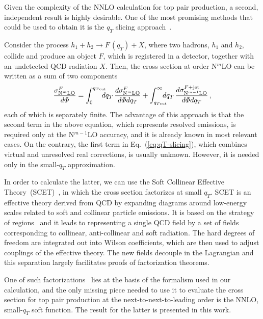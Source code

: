 \documentclass[a4paper,11pt]{article}
\numberwithin{equation}{section}
\begin{document}
Given the complexity of the NNLO calculation for top pair production, a second,
independent result is highly desirable. One of the most promising methods
that could be used to obtain it is the $q_T$ slicing
approach~\cite{Catani:2007vq}. 

Consider the process $  h_1 + h_2 \to F\, {\textstyle (q_T)} + X$,
where two hadrons, $h_1$ and $h_2$, collide and produce an object $F$, which is
registered in a detector, together with an undetected QCD radiation $X$. Then,
the cross section at order N$^m$LO can be written as
a sum of two components
%
\begin{equation}
  \frac{\sigma_{{\rm N}^m{\rm LO}}^{F}}{d\Phi} = 
  \int^{q_{T{\rm cut}}}_0 
  \!\!\!\!\! d q_T\,
  \frac{d\sigma^{F}_{{\rm N}^m{\rm LO}}}{d\Phi dq_T} +
  \int_{q_{T{\rm cut}}}^\infty 
  \!\!\!\!\! d q_T\,
  \frac{d\sigma^{F + {\rm jet}}_{{\rm N}^{m-1}{\rm LO}}}{d\Phi dq_T}\,,
  \label{eq:qT-slicing}
\end{equation}
%
each of which is separately finite.
%
The advantage of this approach is that the second term in the above equation,
which represents resolved emissions, is required only at the N$^{m-1}$LO
accuracy, and it is already known in most relevant cases.  
%
On the contrary, the first term in Eq.~(\ref{eq:qT-slicing}), which combines
virtual and unresolved real corrections, is usually unknown. However, it is
needed only in the small-$q_T$ approximation.

In order to calculate the latter, we can use the Soft Collinear Effective
Theory~(SCET)~\cite{Becher:2014oda}, in which the cross section factorizes at
small $q_T$. 
%
SCET is an effective theory derived from QCD by expanding diagrams around
low-energy scales related to soft and collinear particle emissions. It is based
on the strategy of regions~\cite{Jantzen:2011nz} and it leads to representing a
single QCD field by a set of fields corresponding to collinear, anti-collinear
and soft radiation. The hard degrees of freedom are integrated out into Wilson
coefficients, which are then used to adjust couplings of the effective
theory. The new fields decouple in the Lagrangian and this separation largely
facilitates proofs of factorization theorems. 

One of such factorizations~\cite{Li:2013mia} lies at the basis of the formalism
used in our calculation, and the only missing piece needed to use it to evaluate
the cross section for top pair production at the next-to-next-to-leading order
is the NNLO, small-$q_T$ soft function. 
%
The result for the latter is presented in this work.
\end{document}
